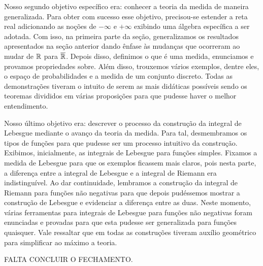 	Nosso segundo objetivo específico era: conhecer a teoria da medida de maneira generalizada.
	Para obter com sucesso esse objetivo, precisou-se estender a reta real adicionando as noções de $-\infty$ e $+\infty$ exibindo uma álgebra específica a ser adotada.
	Com isso, na primeira parte da seção, generalizamos os resultados apresentados na seção anterior dando ênfase às mudanças que ocorreram ao mudar de $\mathbb{R}$ para $\overline{\mathbb{R}}$.
	Depois disso, definimos o que é uma medida, enunciamos e provamos propriedades sobre.
	Além disso, trouxemos vários exemplos, dentre eles, o espaço de probabilidades e a medida de um conjunto discreto.
	Todas as demonstrações tiveram o intuito de serem as mais didáticas possíveis sendo os teoremas divididos em várias proposições para que pudesse haver o melhor entendimento.
	
	Nosso último objetivo era: descrever o processo da construção da integral de Lebesgue mediante o avanço da teoria da medida.
	Para tal, desmembramos os tipos de funções para que pudesse ser um processo intuitivo da construção.
	Exibimos, inicialmente, as integrais de Lebesgue para funções simples.
	Fixamos a medida de Lebesgue para que os exemplos ficassem mais claros, pois nesta parte, a diferença entre a integral de Lebesgue e a integral de Riemann era indistinguível. 
	Ao dar continuidade, lembramos a construção da integral de Riemann para funções não negativas para que depois pudéssemos mostrar a construção de Lebesgue e evidenciar a diferença entre as duas.
	Neste momento, várias ferramentas para integrais de Lebesgue para funções não negativas foram enunciadas e provadas para que esta pudesse ser generalizada para funções quaisquer. Vale ressaltar que em todas as construções tiveram auxílio geométrico para simplificar ao máximo a teoria. 
   	
   	FALTA CONCLUIR O FECHAMENTO.
    
    
    
    
    
    
    
    
    
    
    
    
    
    
    
    
    
    